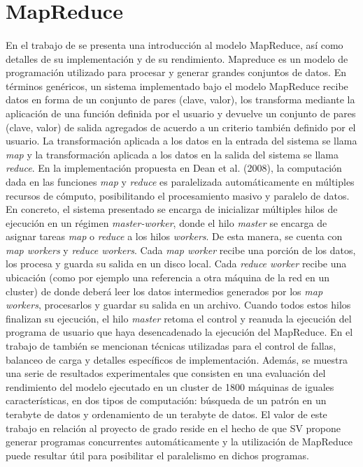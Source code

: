 \section{MapReduce} \label{section-trabajos-relacionados-mapreduce}

\paragraph{}En el trabajo de \citet{mapreduce} se presenta una introducción al modelo MapReduce, así como detalles de su implementación y de su rendimiento. Mapreduce es un modelo de programación utilizado para procesar y generar grandes conjuntos de datos. En términos genéricos, un sistema implementado bajo el modelo MapReduce recibe datos en forma de un conjunto de pares (clave, valor), los transforma mediante la aplicación de una función definida por el usuario y devuelve un conjunto de pares (clave, valor) de salida agregados de acuerdo a un criterio también definido por el usuario. La transformación aplicada a los datos en la entrada del sistema se llama \textit{map} y la transformación aplicada a los datos en la salida del sistema se llama \textit{reduce}. En la implementación propuesta en Dean et al. (2008), la computación dada en las funciones \textit{map} y \textit{reduce} es paralelizada automáticamente en múltiples recursos de cómputo, posibilitando el procesamiento masivo y paralelo de datos. En concreto, el sistema presentado se encarga de inicializar múltiples hilos de ejecución en un régimen \textit{master-worker}, donde el hilo \textit{master} se encarga de asignar tareas \textit{map} o \textit{reduce} a los hilos \textit{workers}. De esta manera, se cuenta con \textit{map workers} y \textit{reduce workers}. Cada \textit{map worker} recibe una porción de los datos, los procesa y guarda su salida en un disco local. Cada \textit{reduce worker} recibe una ubicación (como por ejemplo una referencia a otra máquina de la red en un cluster) de donde deberá leer los datos intermedios generados por los \textit{map workers}, procesarlos y guardar su salida en un archivo. Cuando todos estos hilos finalizan su ejecución, el hilo \textit{master} retoma el control y reanuda la ejecución del programa de usuario que haya desencadenado la ejecución del MapReduce.
En el trabajo de \cite{mapreduce} también se mencionan técnicas utilizadas para el control de fallas, balanceo de carga y detalles específicos de implementación. Además, se muestra una serie de resultados experimentales que consisten en una evaluación del rendimiento del modelo ejecutado en un cluster de 1800 máquinas de iguales características, en dos tipos de computación: búsqueda de un patrón en un terabyte de datos y ordenamiento de un terabyte de datos. 
El valor de este trabajo en relación al proyecto de grado reside en el hecho de que SV propone generar programas concurrentes automáticamente y la utilización de MapReduce puede resultar útil para posibilitar el paralelismo en dichos programas.

